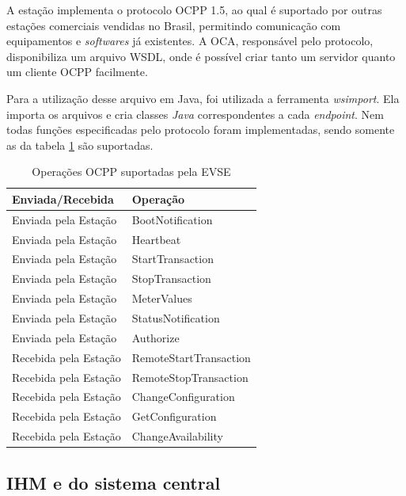 A estação implementa o protocolo \ac{OCPP} 1.5, ao qual é suportado por outras estações comerciais vendidas no Brasil, permitindo comunicação com equipamentos e \textit{softwares} já existentes. A \ac{OCA}, responsável pelo protocolo, disponibiliza um arquivo WSDL, onde é possível criar tanto um servidor quanto um cliente OCPP facilmente.

Para a utilização desse arquivo em Java, foi utilizada a ferramenta \textit{wsimport}. Ela importa os arquivos e cria classes \textit{Java} correspondentes a cada \textit{endpoint}. Nem todas funções especificadas pelo protocolo foram implementadas, sendo somente as da tabela \ref{table:ocpp} são suportadas.

\begin{table}[]
  \centering
  \caption{Operações OCPP suportadas pela \ac{EVSE}}
  \label{table:ocpp}
  \begin{tabular}{@{}ll@{}}
    \toprule
    \textbf{Enviada/Recebida} & \textbf{Operação}      \\ \midrule
      Enviada pela Estação      & BootNotification       \\
      Enviada pela Estação      & Heartbeat              \\
      Enviada pela Estação      & StartTransaction       \\
      Enviada pela Estação      & StopTransaction        \\
      Enviada pela Estação      & MeterValues            \\
      Enviada pela Estação      & StatusNotification     \\
      Enviada pela Estação      & Authorize              \\
      Recebida pela Estação     & RemoteStartTransaction \\
      Recebida pela Estação     & RemoteStopTransaction  \\
      Recebida pela Estação     & ChangeConfiguration    \\
      Recebida pela Estação     & GetConfiguration       \\
      Recebida pela Estação     & ChangeAvailability     \\ \bottomrule
    \end{tabular}
\end{table}

\subsection{IHM e do sistema central}

